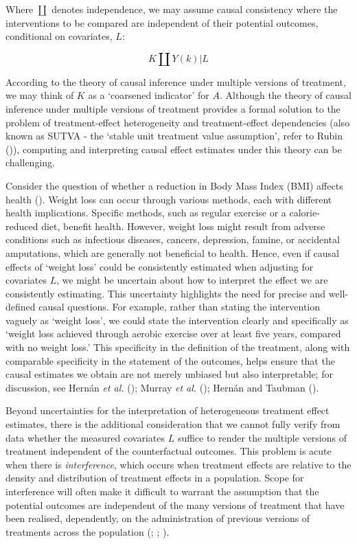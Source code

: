 \documentclass[
  single column]{article}
\begin{document}
Where \(\coprod\) denotes independence, we may assume causal consistency
where the interventions to be compared are independent of their
potential outcomes, conditional on covariates, \(L\):

\[
K \coprod Y(k) | L
\]

According to the theory of causal inference under multiple versions of
treatment, we may think of \(K\) as a `coarsened indicator' for \(A\).
Although the theory of causal inference under multiple versions of
treatment provides a formal solution to the problem of treatment-effect
heterogeneity and treatment-effect dependencies (also known as SUTVA -
the `stable unit treatment value assumption', refer to Rubin
()), computing and
interpreting causal effect estimates under this theory can be
challenging.

Consider the question of whether a reduction in Body Mass Index (BMI)
affects health ().
Weight loss can occur through various methods, each with different
health implications. Specific methods, such as regular exercise or a
calorie-reduced diet, benefit health. However, weight loss might result
from adverse conditions such as infectious diseases, cancers,
depression, famine, or accidental amputations, which are generally not
beneficial to health. Hence, even if causal effects of `weight loss'
could be consistently estimated when adjusting for covariates \(L\), we
might be uncertain about how to interpret the effect we are consistently
estimating. This uncertainty highlights the need for precise and
well-defined causal questions. For example, rather than stating the
intervention vaguely as `weight loss', we could state the intervention
clearly and specifically as `weight loss achieved through aerobic
exercise over at least five years, compared with no weight loss.' This
specificity in the definition of the treatment, along with comparable
specificity in the statement of the outcomes, helps ensure that the
causal estimates we obtain are not merely unbiased but also
interpretable; for discussion, see Hernán \emph{et al.}
(); Murray \emph{et al.}
(); Hernán and Taubman
().

Beyond uncertainties for the interpretation of heterogeneous treatment
effect estimates, there is the additional consideration that we cannot
fully verify from data whether the measured covariates \(L\) suffice to
render the multiple versions of treatment independent of the
counterfactual outcomes. This problem is acute when there is
\emph{interference}, which occurs when treatment effects are relative to
the density and distribution of treatment effects in a population. Scope
for interference will often make it difficult to warrant the assumption
that the potential outcomes are independent of the many versions of
treatment that have been realised, dependently, on the administration of
previous versions of treatments across the population
(;
;
).
\end{document}
